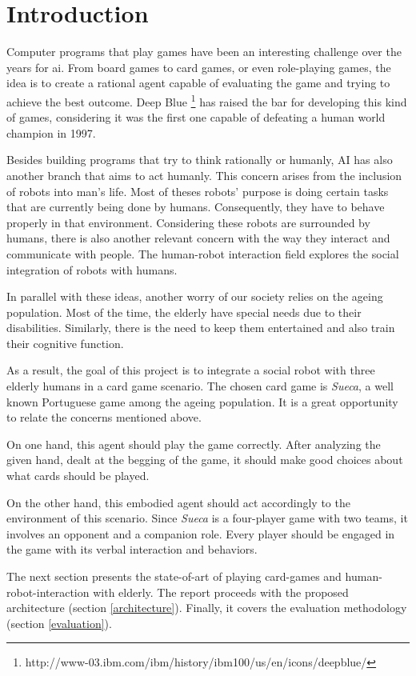 \section{Introduction} \label{introduction}

Computer programs that play games have been an interesting challenge over the years for \gls{ai}. From board games to card games, or even role-playing games, the idea is to create a rational agent capable of evaluating the game and trying to achieve the best outcome. Deep Blue \footnote{http://www-03.ibm.com/ibm/history/ibm100/us/en/icons/deepblue/} has raised the bar for developing this kind of games, considering it was the first one capable of defeating a human world champion in 1997.

Besides building programs that try to think rationally or humanly, AI has also another branch that aims to act humanly. This concern arises from the inclusion of robots into man's life. Most of theses robots' purpose is doing certain tasks that are currently being done by humans. Consequently, they have to behave properly in that environment. Considering these robots are surrounded by humans, there is also another relevant concern with the way they interact and communicate with people. The human-robot interaction field explores the social integration of robots with humans.

In parallel with these ideas, another worry of our society relies on the ageing population. Most of the time, the elderly have special needs due to their disabilities. Similarly, there is the need to keep them entertained and also train their cognitive function.

As a result, the goal of this project is to integrate a social robot with three elderly humans in a card game scenario. The chosen card game is \emph{Sueca}, a well known Portuguese game among the ageing population. It is a great opportunity to relate the concerns mentioned above.

On one hand, this agent should play the game correctly. After analyzing the given hand, dealt at the begging of the game, it should make good choices about what cards should be played.

On the other hand, this embodied agent should act accordingly to the environment of this scenario. Since \emph{Sueca} is a four-player game with two teams, it involves an opponent and a companion role. Every player should be engaged in the game with its verbal interaction and behaviors.


The next section presents the state-of-art of playing card-games and human-robot-interaction with elderly. The report proceeds with the proposed architecture (section \ref{architecture}). Finally, it covers the evaluation methodology (section \ref{evaluation}). 